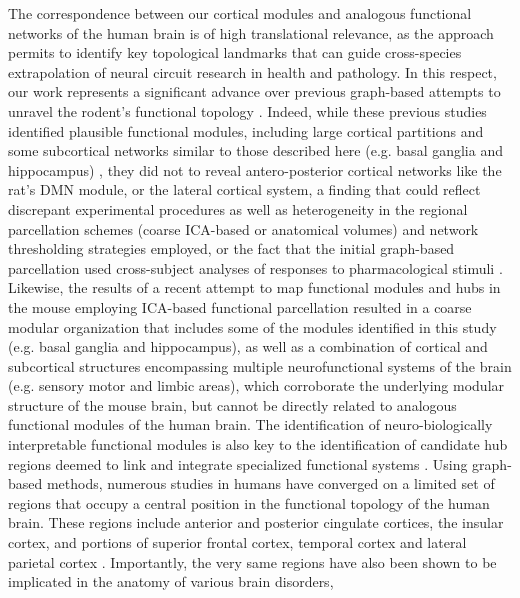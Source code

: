 The correspondence between our cortical modules and analogous functional
networks of the human brain is of high translational relevance, as the approach
permits to identify key topological landmarks that can guide cross-species
extrapolation of neural circuit research in health and pathology. In this
respect, our work represents a significant advance over previous graph-based
attempts to unravel the rodent’s functional topology \parencite{bifone2010,
dsouza2014, liang2011, liang2012, schwarz2008, schwarz2009}. Indeed, while these
previous studies identified plausible functional modules, including large
cortical partitions \parencite{liang2011} and some subcortical networks similar
to those described here (e.g.  basal ganglia and hippocampus)
\parencite{dsouza2014, liang2011}, they did not to reveal antero-posterior
cortical networks like the rat’s DMN module, or the lateral cortical system, a
finding that could reflect discrepant experimental procedures as well as
heterogeneity in the regional parcellation schemes (coarse ICA-based or
anatomical volumes) and network thresholding strategies employed, or the fact
that the initial graph-based parcellation used cross-subject analyses of
responses to pharmacological stimuli \parencite{bifone2010, schwarz2008,
schwarz2009}. Likewise, the results of a recent attempt to map functional
modules and hubs in the mouse employing ICA-based functional parcellation
\parencite{mechling2014} resulted in a coarse modular organization that includes
some of the modules identified in this study (e.g. basal ganglia and
hippocampus), as well as a combination of cortical and subcortical structures
encompassing multiple neurofunctional systems of the brain (e.g. sensory motor
and limbic areas), which corroborate the underlying modular structure of the
mouse brain, but cannot be directly related to analogous functional modules of
the human brain.  The identification of neuro-biologically interpretable
functional modules is also key to the identification of candidate hub regions
deemed to link and integrate specialized functional systems
\parencite{sporns2013}. Using graph-based methods, numerous studies in humans
have converged on a limited set of regions that occupy a central position in the
functional topology of the human brain. These regions include anterior and
posterior cingulate cortices, the insular cortex, and portions of superior
frontal cortex, temporal cortex and lateral parietal cortex \parencite{cole2010,
sporns2014, tomasi2011, vandenheuvel2013}. Importantly, the very same regions
have also been shown to be implicated in the anatomy of various brain disorders,
